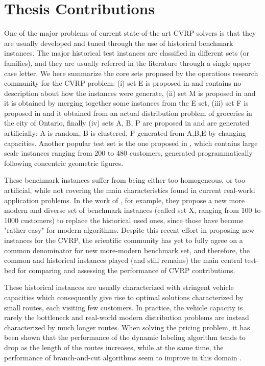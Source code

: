 \section{Thesis Contributions}
\label{sec:intro-thesis-contributions}

One of the major problems of current state-of-the-art CVRP solvers
is that they are usually developed and tuned through the use of historical
benchmark instances.
The major historical test instances are classified in different sets (or families), and
they are usually referred in the literature through a single upper case letter.
We here summarize the core sets proposed by the operations research community for the CVRP problem:
(i) set E is proposed in \textcite{christofides1969} and contains no description about how the instances were generate,
(ii) set M is proposed in \textcite{christofides1979} and it is obtained by merging together some instances from the E set,
(iii) set F is proposed in \textcite{fisher1994} and it obtained from an actual distribution problem of groceries in the city of Ontario,
finally (iv) sets A, B, P are proposed in \textcite{augerat1995} and are generated artificially: A is random, B is clustered, P generated from A,B,E by changing capacities.
Another popular test set is the one proposed in \textcite{golden1998},
which contains large scale instances ranging from 200 to 480 customers,
generated programmatically following concentric geometric figures.

These benchmark instances suffer from being either too homogeneous, or too artificial,
while not covering the main characteristics found in current real-world application problems.
In the work of \textcite{uchoa2017}, for example, they propose
a new more modern and diverse set of benchmark instances (called set X, ranging from 100 to 1000 customers)
to replace the historical used ones, since those have become "rather easy" for modern algorithms.
Despite this recent effort in proposing new instances for the CVRP, the scientific community
has yet to fully agree on a common denominator for new more-modern benchmark set, and therefore,
the common and historical instances played (and still remains) the main central test-bed for comparing
and assessing the performance of CVRP contributions.

These historical instances are usually characterized with stringent vehicle capacities
which consequently give rise to optimal solutions characterized by small routes, each visiting few customers.
In practice, the vehicle capacity is rarely the bottleneck and
real-world modern distribution problems are instead characterized by much longer routes.
When solving the pricing problem, it has been shown that the performance of the dynamic labeling algorithm
tends to drop as the length of the routes increases,
while at the same time,
the performance of branch-and-cut algorithms seem to improve in this domain .

